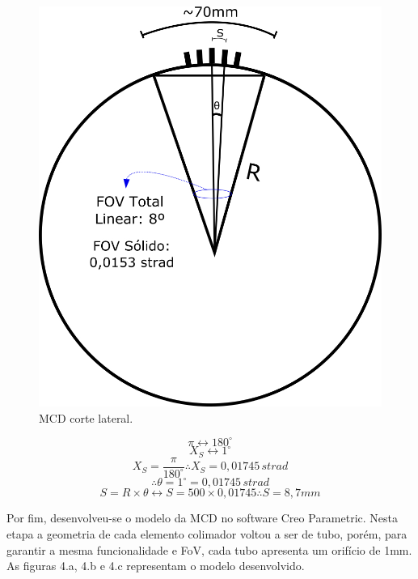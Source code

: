 \documentclass[a4paper,12pt]{article}
\begin{document}
\begin{figure}[htb] 
	\centering
	\includegraphics[scale=0.4]{MCD_3.jpg}
	\caption{MCD corte lateral.}
\end{figure}

$$ \pi \longleftrightarrow 180^{\circ}$$
$$ X_{S} \longleftrightarrow 1^{\circ}$$
$$X_{S} = \frac{\pi}{180^{\circ}} \therefore X_{S} = 0,01745\, strad$$
$$\therefore \theta = 1^{\circ} = 0,01745 \,strad$$
$$S= R\times \theta \longleftrightarrow S= 500\times 0,01745 \therefore S=8,7mm $$

Por fim, desenvolveu-se o modelo da MCD no software Creo Parametric. Nesta etapa a geometria de cada elemento colimador voltou a ser de tubo, porém, para garantir a mesma funcionalidade e FoV, cada tubo apresenta um orifício de 1mm.   As figuras 4.a, 4.b e 4.c representam o modelo desenvolvido.
\end{document}
